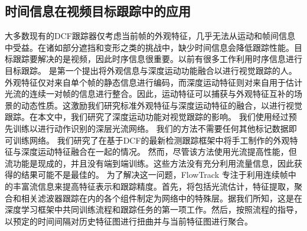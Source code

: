 \subsection{时间信息在视频目标跟踪中的应用}
大多数现有的DCF跟踪器仅考虑当前帧的外观特征，几乎无法从运动和帧间信息中受益。在诸如部分遮挡和变形之类的挑战中，缺少时间信息会降低跟踪性能。目标跟踪要解决的是视频，因此时序信息很重要。以前有很多工作利用时序信息进行目标跟踪。
\cite{DeepMotion} 是第一个提出将外观信息与深度运动功能融合以进行视觉跟踪的人。外观特征仅对来自单个帧的静态信息进行编码，而深度运动特征则对来自用于估计光流的连续一对帧的信息进行整合。因此，运动特征可以捕获与外观特征互补的场景的动态性质。这激励我们研究标准外观特征与深度运动特征的融合，以进行视觉跟踪。在本文中，我们研究了深度运动功能对视觉跟踪的影响。 我们使用经过预先训练以进行动作识别的深层光流网络。 我们的方法不需要任何其他标记数据即可训练网络。 我们研究了在基于DCF的最新检测跟踪框架中将手工制作的外观特征与深度运动特征融合在一起的情况。
然而，尽管该方法使用光流提高性能，但流功能是现成的，并且没有端到端训练。这些方法没有充分利用流量信息，因此获得的结果可能不是最佳的。
为了解决这一问题，FlowTrack \cite{FlowTrack} 专注于利用连续帧中的丰富流信息来提高特征表示和跟踪精度。首先，将包括光流估计，特征提取，聚合和相关滤波器跟踪在内的各个组件制定为网络中的特殊层。据我们所知，这是在深度学习框架中共同训练流程和跟踪任务的第一项工作。然后，按照流程的指导，以预定的时间间隔对历史特征图进行扭曲并与当前特征图进行聚合。

